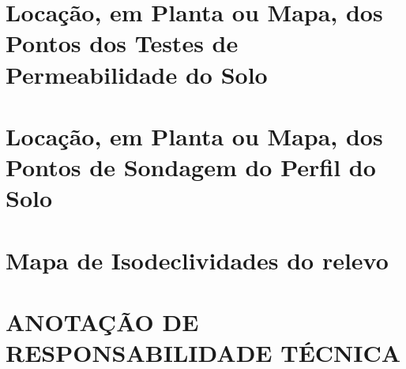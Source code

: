 \chapter{Locação, em Planta ou Mapa, dos Pontos dos Testes de Permeabilidade do Solo}
\label{chap:permeabilidade}
\clearpage


\chapter{Locação, em Planta ou Mapa, dos Pontos de Sondagem do Perfil do Solo}
\label{chap:sondspec}
\clearpage















\chapter{Mapa de Isodeclividades do relevo}
\label{chap:declividade}
\clearpage



\chapter{ANOTAÇÃO DE RESPONSABILIDADE TÉCNICA}

